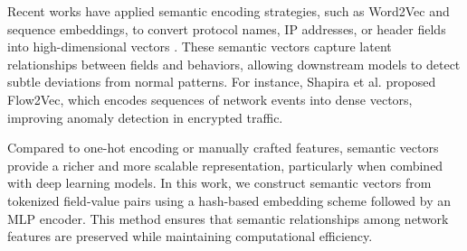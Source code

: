 \begin{ZhChapter}
    Recent works have applied semantic encoding strategies, such as Word2Vec and sequence embeddings, to convert protocol names, IP addresses, or header fields into high-dimensional vectors \cite{shapira2021flow,li2020embedding}. These semantic vectors capture latent relationships between fields and behaviors, allowing downstream models to detect subtle deviations from normal patterns. For instance, Shapira et al. \cite{shapira2021flow} proposed Flow2Vec, which encodes sequences of network events into dense vectors, improving anomaly detection in encrypted traffic.

    Compared to one-hot encoding or manually crafted features, semantic vectors provide a richer and more scalable representation, particularly when combined with deep learning models. In this work, we construct semantic vectors from tokenized field-value pairs using a hash-based embedding scheme followed by an MLP encoder. This method ensures that semantic relationships among network features are preserved while maintaining computational efficiency.



\end{ZhChapter}